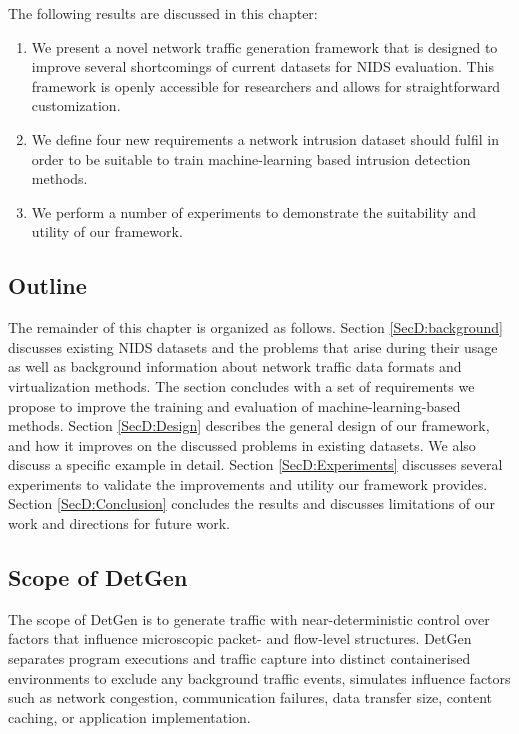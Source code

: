 The following results are discussed in this chapter:

\begin{enumerate}
 \item We present a novel network traffic generation framework that is designed to improve several shortcomings of current datasets for NIDS evaluation. This framework is openly accessible for researchers and allows for straightforward customization.
 \item We define four new requirements a network intrusion dataset should fulfil in order to be suitable to train machine-learning based intrusion detection methods. 
 \item We perform a number of experiments to demonstrate the suitability and utility of our framework. 
\end{enumerate}

\subsection{Outline}

The remainder of this chapter is organized as follows. Section \ref{SecD:background} discusses existing NIDS datasets and the problems that arise during their usage as well as background information about network traffic data formats and virtualization methods. The section concludes with a set of requirements we propose to improve the training and evaluation of machine-learning-based methods. Section \ref{SecD:Design} describes the general design of our framework, and how it improves on the discussed problems in existing datasets. We also discuss a specific example in detail. Section \ref{SecD:Experiments} discusses several experiments to validate the improvements and utility our framework provides. 
Section \ref{SecD:Conclusion} concludes the results and discusses limitations of our work and directions for future work.

\subsection{Scope of DetGen}

The scope of DetGen is to generate traffic with near-deterministic control over factors that influence microscopic packet- and flow-level structures. DetGen separates program executions and traffic capture into distinct containerised environments to exclude any background traffic events, simulates influence factors such as network congestion, communication failures, data transfer size, content caching, or application implementation. %



